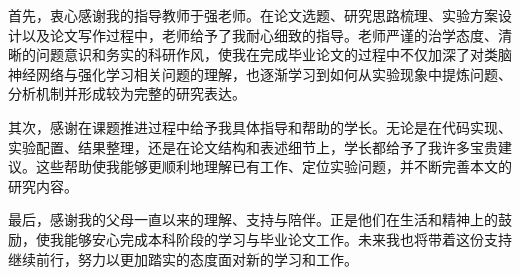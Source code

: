 \documentclass[UTF8,zihao=-4,oneside,openany]{ctexbook}
\begin{document}
首先，衷心感谢我的指导教师于强老师。在论文选题、研究思路梳理、实验方案设计以及论文写作过程中，老师给予了我耐心细致的指导。老师严谨的治学态度、清晰的问题意识和务实的科研作风，使我在完成毕业论文的过程中不仅加深了对类脑神经网络与强化学习相关问题的理解，也逐渐学习到如何从实验现象中提炼问题、分析机制并形成较为完整的研究表达。

其次，感谢在课题推进过程中给予我具体指导和帮助的学长。无论是在代码实现、实验配置、结果整理，还是在论文结构和表述细节上，学长都给予了我许多宝贵建议。这些帮助使我能够更顺利地理解已有工作、定位实验问题，并不断完善本文的研究内容。

最后，感谢我的父母一直以来的理解、支持与陪伴。正是他们在生活和精神上的鼓励，使我能够安心完成本科阶段的学习与毕业论文工作。未来我也将带着这份支持继续前行，努力以更加踏实的态度面对新的学习和工作。
\end{document}
